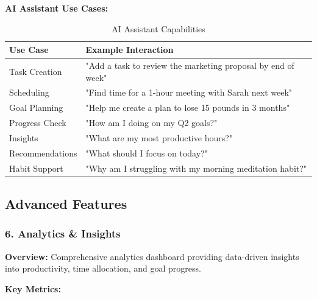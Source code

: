 \textbf{AI Assistant Use Cases:}

\begin{table}[H]
\centering
\caption{AI Assistant Capabilities}
\begin{tabular}{|l|p{10cm}|}
\hline
\rowcolor{lightgray}
\textbf{Use Case} & \textbf{Example Interaction} \\
\hline
Task Creation & "Add a task to review the marketing proposal by end of week" \\
\hline
Scheduling & "Find time for a 1-hour meeting with Sarah next week" \\
\hline
Goal Planning & "Help me create a plan to lose 15 pounds in 3 months" \\
\hline
Progress Check & "How am I doing on my Q2 goals?" \\
\hline
Insights & "What are my most productive hours?" \\
\hline
Recommendations & "What should I focus on today?" \\
\hline
Habit Support & "Why am I struggling with my morning meditation habit?" \\
\hline
\end{tabular}
\end{table}

\subsection{Advanced Features}

\subsubsection{6. Analytics \& Insights}

\textbf{Overview:}
Comprehensive analytics dashboard providing data-driven insights into productivity, time allocation, and goal progress.

\textbf{Key Metrics:}

